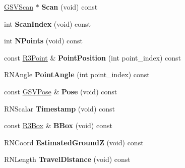 \begin{DoxyCompactItemize}
\item 
\hyperlink{class_g_s_v_scan}{G\+S\+V\+Scan} $\ast$ {\bfseries Scan} (void) const \hypertarget{class_g_s_v_scanline_a373041f20596c09f63a674ea235b8781}{}\label{class_g_s_v_scanline_a373041f20596c09f63a674ea235b8781}

\item 
int {\bfseries Scan\+Index} (void) const \hypertarget{class_g_s_v_scanline_a6e550110bc9ddfd00889ecd9f2f625c2}{}\label{class_g_s_v_scanline_a6e550110bc9ddfd00889ecd9f2f625c2}

\item 
int {\bfseries N\+Points} (void) const \hypertarget{class_g_s_v_scanline_ac2c8e55cd0b96686f05caded4fedc3ed}{}\label{class_g_s_v_scanline_ac2c8e55cd0b96686f05caded4fedc3ed}

\item 
const \hyperlink{class_r3_point}{R3\+Point} \& {\bfseries Point\+Position} (int point\+\_\+index) const \hypertarget{class_g_s_v_scanline_a1baccce2b926d87ea9f4333015000c0b}{}\label{class_g_s_v_scanline_a1baccce2b926d87ea9f4333015000c0b}

\item 
R\+N\+Angle {\bfseries Point\+Angle} (int point\+\_\+index) const \hypertarget{class_g_s_v_scanline_a9fdbebca0dff946ef2789784bdb19e12}{}\label{class_g_s_v_scanline_a9fdbebca0dff946ef2789784bdb19e12}

\item 
const \hyperlink{class_g_s_v_pose}{G\+S\+V\+Pose} \& {\bfseries Pose} (void) const \hypertarget{class_g_s_v_scanline_ad1f9d154b18731d0a57c32c88813305e}{}\label{class_g_s_v_scanline_ad1f9d154b18731d0a57c32c88813305e}

\item 
R\+N\+Scalar {\bfseries Timestamp} (void) const \hypertarget{class_g_s_v_scanline_a39c4251eb49f83d5230b26fcf76c0963}{}\label{class_g_s_v_scanline_a39c4251eb49f83d5230b26fcf76c0963}

\item 
const \hyperlink{class_r3_box}{R3\+Box} \& {\bfseries B\+Box} (void) const \hypertarget{class_g_s_v_scanline_ac061beece30a811624fe558d65fb6204}{}\label{class_g_s_v_scanline_ac061beece30a811624fe558d65fb6204}

\item 
R\+N\+Coord {\bfseries Estimated\+GroundZ} (void) const \hypertarget{class_g_s_v_scanline_ad790af88896cc036ebed039310def45b}{}\label{class_g_s_v_scanline_ad790af88896cc036ebed039310def45b}

\item 
R\+N\+Length {\bfseries Travel\+Distance} (void) const \hypertarget{class_g_s_v_scanline_ae1793a7bcbe35018825e1b18ce8de0f4}{}\label{class_g_s_v_scanline_ae1793a7bcbe35018825e1b18ce8de0f4}


\end{DoxyCompactItemize}
